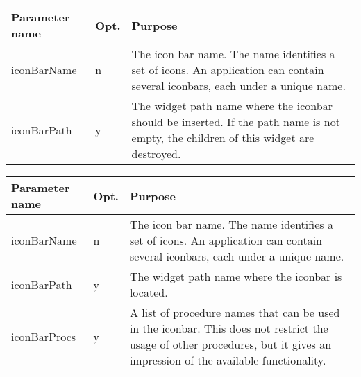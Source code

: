 {\newpage
\clearpage
\samepage \begin{tabular}{|l|l|p{6.5cm}|} \hline
Parameter name  & Opt. & Purpose\\  \hline
iconBarName     & n    & The icon bar name. The name
                         identifies a set of icons. An
                         application can contain several
                         iconbars, each under a unique
                         name.\\  \hline
iconBarPath     & y    & The widget path name where the
                         iconbar should be inserted. If the
                         path name is not empty, the
                         children of this widget are
                         destroyed.\\  \hline
\end{tabular}
}

{\newpage
\clearpage
\samepage \begin{tabular}{|l|l|p{6.5cm}|} \hline
Parameter name  & Opt. & Purpose\\  \hline
iconBarName     & n    & The icon bar name. The name
                         identifies a set of icons. An
                         application can contain several
                         iconbars, each under a unique
                         name.\\  \hline
iconBarPath     & y    & The widget path name where the
                         iconbar is located.\\  \hline
iconBarProcs    & y    & A list of procedure names that can
                         be used in the iconbar. This does
                         not restrict the usage of other
                         procedures, but it gives an
                         impression of the available
                         functionality.\\  \hline
\end{tabular}
}

